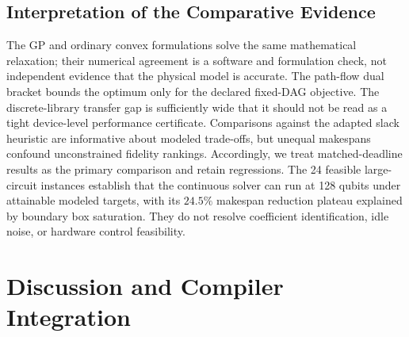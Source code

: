 \documentclass[10pt,letterpaper,journal]{IEEEtran}
\begin{document}
\subsection{Interpretation of the Comparative Evidence}
The GP and ordinary convex formulations solve the same mathematical relaxation; their numerical agreement is a software and formulation check, not independent evidence that the physical model is accurate. The path-flow dual bracket bounds the optimum only for the declared fixed-DAG objective. The discrete-library transfer gap is sufficiently wide that it should not be read as a tight device-level performance certificate. Comparisons against the adapted slack heuristic are informative about modeled trade-offs, but unequal makespans confound unconstrained fidelity rankings. Accordingly, we treat matched-deadline results as the primary comparison and retain regressions. The 24 feasible large-circuit instances establish that the continuous solver can run at 128 qubits under attainable modeled targets, with its $24.5\%$ makespan reduction plateau explained by boundary box saturation. They do not resolve coefficient identification, idle noise, or hardware control feasibility.

\section{Discussion and Compiler Integration}
\end{document}

